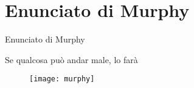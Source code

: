 \section{Enunciato di Murphy}
  \begin{frame}{Enunciato di Murphy}

	\begin{murphy}
	Se qualcosa può andar male, lo farà
	\end{murphy}

	\begin{figure}[h]
	\centering
	\texttt{[image: murphy]}
	\end{figure}

\end{frame}
